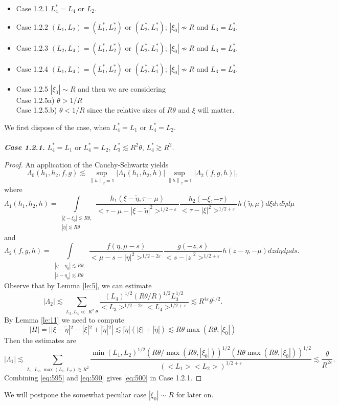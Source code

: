 \documentclass[draft,11pt,leqno]{amsart}
\newcommand{\norm}[2]{{\left\| #1 \right\|}_{#2}}
\newcommand{\ve}{\varepsilon}
\newcommand{\La}{\Lambda}
\newcommand{\intl}{\int\limits}
\newcommand{\suml}{\sum\limits}
\newcommand{\supl}{\sup\limits}
\newcommand{\f}{\displaystyle\frac}
\newcommand{\R}{\operatorname{R}}
\newcommand{\lone}{{L_1^{*}}}
\newcommand{\ltwo}{{L_2^{*}}}
\newcommand{\lthree}{{L_3^{*}}}
\newcommand{\lfour}{{L_4^{*}}}
\begin{document}
\begin{itemize}
\item Case 1.2.1 $\lfour=L_4$ or $L_2$.
\item Case 1.2.2 $(L_1,L_2)=(\lone,\ltwo)$ or $(\ltwo,\lone)$; 
$|\xi_0|\nsim R$ and $L_3=\lfour$.
\item Case 1.2.3 $(L_2,L_4)=(\lone,\ltwo)$ or $(\ltwo,\lone)$; 
$|\xi_0|\nsim R$ and $L_3=\lfour$.
\item Case 1.2.4 $(L_1,L_4)=(\lone,\ltwo)$ or $(\ltwo,\lone)$; 
$|\xi_0|\nsim R$ and $L_3=\lfour$.
\item Case 1.2.5 $|\xi_0|\sim R$ and then we are considering \\
 Case 1.2.5a) $\theta>1/R$ \\ 
 Case 1.2.5.b) $\theta<1/R$ since the relative sizes of $R\theta$ and 
$\xi$ will matter.
\end{itemize}

We  first dispose of the case, when $\lfour=L_1$ or
$\lfour=L_2$.\\ \\ 
{\it\bf Case 1.2.1.} $\lfour=L_1$ or $\lfour=L_2$,
$\lthree\lesssim R^2\theta$, $\lfour\gtrsim R^2$.\\
\begin{proof}
An application of the
Cauchy-Schwartz yields $$ \La_0(h_1,h_2,f,g)\lesssim
\supl_{\norm{h}{2}=1}|\La_1(h_1,h_2,h)|\supl_{\norm{h}{2}=1}|\La_2(f,g,h)|,
$$ where 
$$
\La_1(h_1,h_2,h)= \intl_{\begin{array}{l}
|\xi-\xi_0|\lesssim  R\theta, \\
|\tilde{\eta}|\lesssim R\theta
\end{array}}
\f{h_1(\xi-\tilde{\eta},\tau-\mu)}{<\tau-\mu-|\xi-\tilde{\eta}|^2>^
{1/2+\ve}} \f{h_2(-\xi,-\tau)}{<\tau-|\xi|^2>^{1/2+\ve}} h(\tilde{\eta},\mu)d\xi d\tau d\tilde{\eta}d\mu
$$
and
$$
\La_2(f,g,h)=\intl_{\begin{array}{l}
|\eta-\eta_0|\lesssim  R\theta, \\
|z-\eta_0|\lesssim R\theta
\end{array}} \f{f(\eta,\mu-s)}{<\mu-s-|\eta|^2>^{1/2-2\ve}}
\f{g(-z,s)}{<s-|z|^2>^{1/2+\ve}} h(z-\eta,-\mu)dzd\eta d\mu ds. $$
Observe that by Lemma \ref{le:5}, we can estimate
\begin{equation}
\label{eq:595} |\La_2|\lesssim \suml_{L_3, L_4 \ll \R^2\theta}
\f{(L_4)^{1/2}(R\theta/R)^{1/2}L_3^{1/2}}{<L_3>^{1/2-2\ve}<L_4>^{1/2+\ve}}
\lesssim R^{4\ve}\theta^{1/2}.
\end{equation}
By Lemma \ref{le:11}  we need to compute
$$
|H|=||\xi-\tilde{\eta}|^2-|\xi|^2+|\tilde{\eta}|^2|\lesssim
|\tilde{\eta}|(|\xi|+|\tilde{\eta}|)\lesssim R\theta \max(R\theta,|\xi_0|)
$$
Then the estimates are
\begin{equation} \label{eq:590} |\La_1|\lesssim
\suml_{L_1,L_2,\max(L_1,L_2)\gtrsim R^2}\f{\min(L_1,L_2)^{1/2}
(R\theta/\max(R\theta,|\xi_0|))^{1/2}(R\theta\max(R\theta,|\xi_0|))^{1/2}}
{(<L_1><L_2>)^{1/2+\ve}}\lesssim \f{\theta}{R^{2\ve}}.
\end{equation}
Combining \eqref{eq:595} and \eqref{eq:590} gives \eqref{eq:500}
in Case 1.2.1.
\end{proof}
We will postpone the somewhat 
peculiar case $|\xi_0|\sim R$ for later on.
\end{document}
